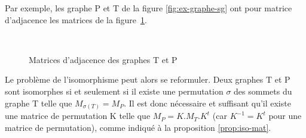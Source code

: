 Par exemple, les graphe P et T de la figure \ref{fig:ex-graphe-sg} ont pour matrice d'adjacence les matrices de la figure~\ref{fig:mat-adj}. 


\begin{figure}[ht]
\begin{center}
  \quad
  \\
\end{center}
\caption{Matrices d'adjacence des graphes T et P}
\label{fig:mat-adj}
\end{figure}

Le problème de l'isomorphisme peut alors se reformuler. Deux graphes T et P sont isomorphes si et seulement si il existe une permutation $\sigma$ des sommets du graphe T telle
que $M_{\sigma(T)}=M_P$. Il est donc nécessaire et suffisant qu'il existe une matrice de permutation K telle que $M_P = K.M_T.K^t$ (car $K^{-1}=K^t$ pour une matrice de permutation), comme indiqué à la proposition \ref{prop:iso-mat}.

